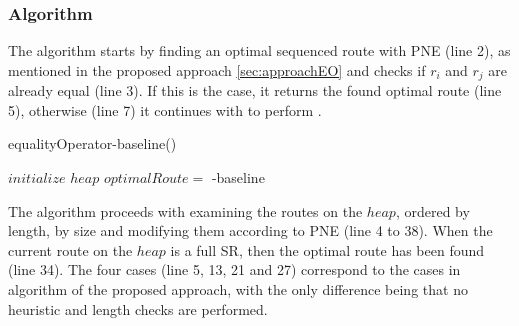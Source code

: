 \subsubsection{Algorithm}
The algorithm \texttt{} starts by finding an optimal sequenced route with PNE (line 2), as mentioned in the proposed approach \ref{sec:approachEO} and checks if $r_i$ and $r_j$ are already equal (line 3). If this is the case, it returns the found optimal route (line 5), otherwise (line 7) it continues with to perform \texttt{}. 

\pagebreak

\begin{algorithm}[H]
\caption{equalityOperator-baseline()}
\label{alg:equality_baseline}
	
	
	
	\BlankLine
	
	$initialize$ $heap$ 
	$optimalRoute =$\;
	{
		\modifiedPNE-baseline{}\;
	}
\end{algorithm}

The algorithm \texttt{} proceeds with examining the routes on the $heap$, ordered by length, by size and modifying them according to PNE (line 4 to 38). When the current route on the $heap$ is a full SR, then the optimal route has been found (line 34). The four cases (line 5, 13, 21 and 27) correspond to the cases in algorithm of the proposed approach, with the only difference being that no heuristic and length checks are performed. \newline

\raggedbottom

